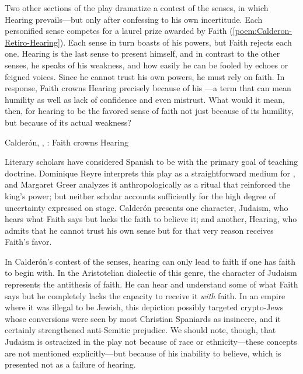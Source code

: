 Two other sections of the play dramatize a contest of the senses, in which
Hearing prevails---but only after confessing to his own incertitude.
Each personified sense competes for a laurel prize awarded by Faith
(\cref{poem:Calderon-Retiro-Hearing}).
Each sense in turn boasts of his powers, but Faith rejects each one.
Hearing is the last sense to present himself, and in contrast to the other
senses, he speaks of his weakness, and how easily he can be fooled by echoes or
feigned voices.
Since he cannot trust his own powers, he must rely on faith.
In response, Faith crowns Hearing precisely because of his
---a term that can mean humility as well as lack of
confidence and even mistrust.
What would it mean, then, for hearing to be the favored sense of faith not just
because of its humility, but because of its actual weakness?

{Calderón, , : Faith crowns
Hearing}

Literary scholars have considered Spanish  to be
 with the primary goal of teaching
doctrine.
Dominique Reyre interprets this play as a straightforward medium for
, and Margaret Greer analyzes it
anthropologically as a ritual that reinforced the king's power; but neither
scholar accounts sufficiently for the high degree of uncertainty expressed on
stage.%
    \Autocites
    {Reyre:Retiro}
    {Greer:Retiro}
Calderón presents one character, Judaism, who hears what Faith says but lacks
the faith to believe it; and another, Hearing, who admits that he cannot trust
his own sense but for that very reason receives Faith's favor.

In Calderón's contest of the senses, hearing can only lead to faith if one has
faith to begin with.
In the Aristotelian dialectic of this genre, the character of Judaism
represents the antithesis of faith. 
He can hear and understand some of what Faith says but he completely lacks the
capacity to receive it \emph{with} faith.
In an empire where it was illegal to be Jewish, this depiction possibly
targeted crypto-Jews whose conversions were seen by most Christian Spaniards as
insincere, and it certainly strengthened anti-Semitic prejudice.
We should note, though, that Judaism is ostracized in the play not because of
race or ethnicity---these concepts are not mentioned explicitly---but because
of his inability to believe, which is presented not as a failure of hearing.

